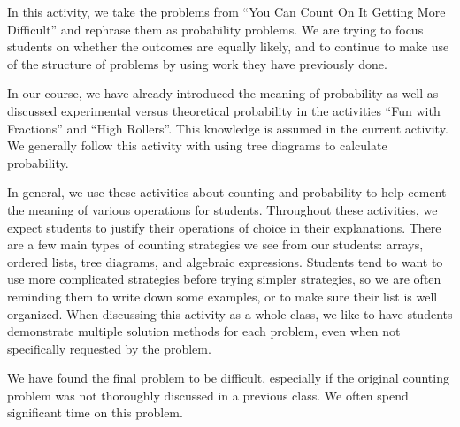 \documentclass[nooutcomes]{ximera}
\begin{document}
\newpage
\begin{instructorNotes}
In this activity, we take the problems from ``You Can Count On It Getting More Difficult'' and rephrase them as probability problems.  We are trying to focus students on whether the outcomes are equally likely, and to continue to make use of the structure of problems by using work they have previously done.

In our course, we have already introduced the meaning of probability as well as discussed experimental versus theoretical probability in the activities ``Fun with Fractions'' and ``High Rollers''.  This knowledge is assumed in the current activity.  We generally follow this activity with using tree diagrams to calculate probability.

In general, we use these activities about counting and probability to help cement the meaning of various operations for students.  Throughout these activities, we expect students to justify their operations of choice in their explanations.  There are a few main types of counting strategies we see from our students: arrays, ordered lists, tree diagrams, and algebraic expressions.  Students tend to want to use more complicated strategies before trying simpler strategies, so we are often reminding them to write down some examples, or to make sure their list is well organized. When discussing this activity as a whole class, we like to have students demonstrate multiple solution methods for each problem, even when not specifically requested by the problem.  

We have found the final problem to be difficult, especially if the original counting problem was not thoroughly discussed in a previous class.  We often spend significant time on this problem.

\end{instructorNotes}
\end{document}
